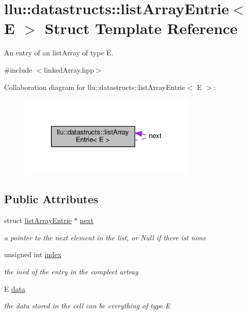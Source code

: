 \hypertarget{structllu_1_1datastructs_1_1list_array_entrie}{\section{llu\+:\+:datastructs\+:\+:list\+Array\+Entrie$<$ E $>$ Struct Template Reference}
\label{structllu_1_1datastructs_1_1list_array_entrie}
}


An entry of an list\+Array of type E.  




{\ttfamily \#include $<$linked\+Array.\+hpp$>$}



Collaboration diagram for llu\+:\+:datastructs\+:\+:list\+Array\+Entrie$<$ E $>$\+:
\nopagebreak
\begin{figure}[H]
\begin{center}
\leavevmode
\includegraphics[width=243pt]{structllu_1_1datastructs_1_1list_array_entrie__coll__graph}
\end{center}
\end{figure}
\subsection*{Public Attributes}
\begin{DoxyCompactItemize}
\item 
struct \hyperlink{structllu_1_1datastructs_1_1list_array_entrie}{list\+Array\+Entrie} $\ast$ \hyperlink{structllu_1_1datastructs_1_1list_array_entrie_a110bf134b27bdfaa3ca518b40042591e}{next}
\begin{DoxyCompactList}\small\item\em a pointer to the next element in the list, or Null if there ist none \end{DoxyCompactList}\item 
unsigned int \hyperlink{structllu_1_1datastructs_1_1list_array_entrie_aed7349160256aefaca0cf5b4caba9de7}{index}
\begin{DoxyCompactList}\small\item\em the ined of the entry in the compleet artray \end{DoxyCompactList}\item 
E \hyperlink{structllu_1_1datastructs_1_1list_array_entrie_a495283bde8e6a508d470e19d39328b39}{data}
\begin{DoxyCompactList}\small\item\em the data stored in the cell can be everything of type E \end{DoxyCompactList}\end{DoxyCompactItemize}


